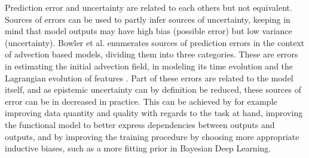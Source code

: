 Prediction error and uncertainty are related to each others but not equivalent. Sources of errors can be used to partly infer sources of uncertainty, keeping in mind that model outputs may have high bias (possible error) but low variance (uncertainty). Bowler et al. enumerates sources of prediction errors in the context of advection based models, dividing them into three categories. These are errors in estimating the initial advection field, in modeling its time evolution and the Lagrangian evolution of features \cite{bowler_steps_2006}. Part of these errors are related to the model itself, and as epistemic uncertainty can by definition be reduced, these sources of error can be in decreased in practice. This can be achieved by for example improving data quantity and quality with regards to the task at hand, improving the functional model to better express dependencies between outputs and outputs, and by improving the training procedure by choosing more appropriate inductive biases, such as a more fitting prior in Bayesian Deep Learning. 


